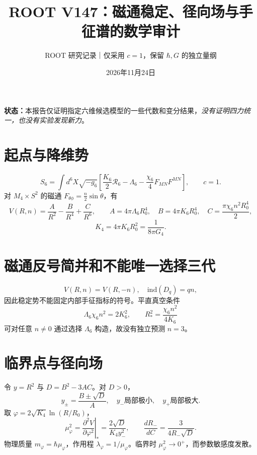 \documentclass[11pt]{ctexart}
\title{ROOT V147：磁通稳定、径向场与手征谱的数学审计}
\author{ROOT 研究记录｜仅采用 $c=1$，保留 $\hbar,G$ 的独立量纲}
\date{2026年11月24日}
\begin{document}
\maketitle
\noindent\textbf{状态：}本报告仅证明指定六维候选模型的一些代数和变分结果，\emph{没有证明四力统一，也没有实验发现新力}。
\section{起点与降维势}
\begin{equation}
 S_6=\int d^6X\sqrt{-g_6}\left[\frac{K_6}{2}\mathcal R_6-\Lambda_6-\frac{\chi_6}{4}F_{MN}F^{MN}\right],\qquad c=1.
\end{equation}
对 $M_4\times S^2$ 的磁通 $F_{\theta\phi}=\frac n2\sin\theta$，有
\begin{equation}
 V(R,n)=\frac{A}{R^2}-\frac{B}{R^4}+\frac{C}{R^6},\qquad
 A=4\pi\Lambda_6R_0^4,\quad B=4\pi K_6R_0^4,\quad C=\frac{\pi\chi_6n^2R_0^4}{2},
\end{equation}
\begin{equation}
 K_4=4\pi K_6R_0^2=\frac1{8\pi G_4}.
\end{equation}
\section{磁通反号简并和不能唯一选择三代}
\begin{equation}
 V(R,n)=V(R,-n),\quad \mathrm{ind}(D_q)=qn,
\end{equation}
因此稳定势不能固定内部手征指标的符号。平直真空条件
\begin{equation}
 \Lambda_6\chi_6n^2=2K_6^2,\qquad
 R_*^2=\frac{\chi_6n^2}{4K_6}
\end{equation}
可对任意 $n\ne0$ 通过选择 $\Lambda_6$ 构造，故没有独立预测 $n=3$。
\section{临界点与径向场}
令 $y=R^2$ 与 $D=B^2-3AC$。对 $D>0$，
\begin{equation}
 y_\pm=\frac{B\pm\sqrt D}{A},\quad y_-\text{局部极小},\quad y_+\text{局部极大}.
\end{equation}
取 $\varphi=2\sqrt{K_4}\ln(R/R_0)$，
\begin{equation}
 \mu_\varphi^2=\left.\frac{\partial^2V}{\partial\varphi^2}\right|_*
 =\frac{2\sqrt D}{K_4y_-^2},\qquad
 \frac{dR_-}{dC}=\frac{3}{4R_-\sqrt D}.
\end{equation}
物理质量 $m_\varphi=\hbar\mu_\varphi$，作用程 $\lambda_\varphi=1/\mu_\varphi$。临界时 $\mu_\varphi^2\to0^+$，而参数敏感度发散。
\end{document}
